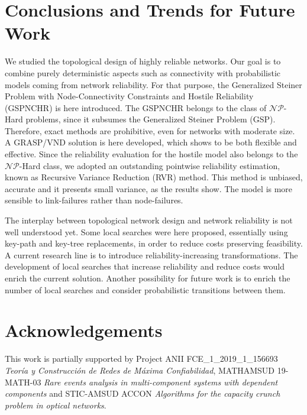 \documentclass{llncs}
\begin{document}
\section{Conclusions and Trends for Future Work}\label{conclusions}
We studied the topological design of highly reliable networks. Our goal is to combine purely  deterministic aspects such as connectivity with probabilistic models coming from network reliability. For that purpose, the Generalized Steiner Problem with Node-Connectivity Constraints and Hostile Reliability (GSPNCHR) is here introduced. The GSPNCHR belongs to the class of $\mathcal{NP}$-Hard problems, since it subsumes the Generalized Steiner Problem (GSP). Therefore, exact methods are prohibitive, even for networks with moderate size. A GRASP/VND solution is here developed, which shows to be both flexible and effective. 
Since the reliability evaluation for the hostile model also belongs to the $\mathcal{NP}$-Hard class, we adopted an outstanding pointwise reliability estimation, known as Recursive Variance Reduction (RVR) method. 
This method is unbiased, accurate and it presents small variance, as the results show. The model is more sensible to link-failures rather than node-failures.

The interplay between topological network design and network reliability is not well understood yet. Some local searches were here proposed, essentially using key-path and key-tree replacements, in order to reduce costs preserving feasibility. A current research line is to introduce reliability-increasing transformations.  
The development of local searches that increase reliability and reduce costs would enrich the current solution. Another possibility for future work is to enrich the number of local searches and consider 
probabilistic transitions between them. 

\section{Acknowledgements}
This work is partially supported by Project ANII FCE\_1\_2019\_1\_156693 \emph{Teor\'ia y Construcci\'on de Redes de M\'axima  Confiabilidad}, MATHAMSUD 19-MATH-03 \emph{Rare events analysis in multi-component systems with dependent components} and
STIC-AMSUD ACCON \emph{Algorithms for the capacity crunch problem in optical networks}. 

%



\end{document}

